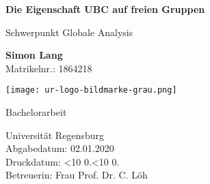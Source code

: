 \documentclass[a4paper,10pt]{scrreprt}
\newcommand{\leadingzero}[1]{\ifnum #1<10 0\the#1\else\the#1\fi}
\newcommand{\todayA}{\leadingzero{\day}.\leadingzero{\month}.\the\year}
\begin{document}
\begin{titlepage}
    \begin{center}
        \vspace*{1cm}
 
        \Huge
        \textbf{Die Eigenschaft UBC auf freien Gruppen}
 
        \vspace{0.5cm}
        \LARGE
        Schwerpunkt Globale Analysis
 
        \vspace{1.5cm}
 
        \textbf{Simon Lang}\\
        \large 
        Matrikelnr.: 1864218
 		
 		\vfill
         \texttt{[image: ur-logo-bildmarke-grau.png]}
 
        \vfill
 		\LARGE
        Bachelorarbeit

        \vspace{0.8cm}
 
        \Large
        Universität Regensburg\\
        Abgabedatum: 02.01.2020\\
        Druckdatum: \todayA\\
        Betreuerin: Frau Prof. Dr. C. Löh
 
    \end{center}
\end{titlepage}
\end{document}
